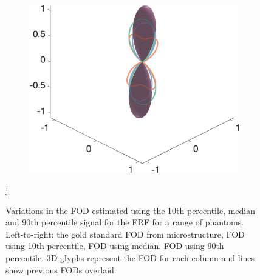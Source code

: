 \begin{figure}
{\begin{minipage}[c]{\textwidth}
\begin{subfigure}[]{0.245\textwidth}
    \includegraphics[width=\textwidth]{figures/frf_experiment/EMfibres_fod_3D_b_3000n_4_f1}
  \end{subfigure}
j  %
  \end{minipage}
}
  
  \caption[Imapct of the FRF variability on FOD estimation]{Variations in the \ac{FOD} estimated using the 10th percentile, median and 90th percentile signal for the \ac{FRF} for a range of phantoms. Left-to-right: the gold standard \ac{FOD} from microstructure, \ac{FOD} using 10th percentile, \ac{FOD} using median, \ac{FOD} using 90th percentile. 3D glyphs represent the \ac{FOD} for each column and lines show previous \acp{FOD} overlaid. }
  \label{fig:frf_fod_kappa_b2000}
\end{figure}


